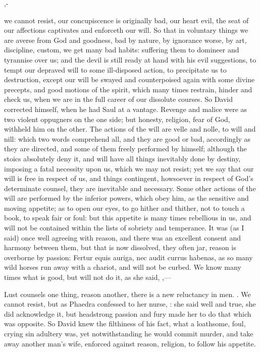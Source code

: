 {,-

we cannot resist, our concupiscence is originally bad, our heart evil,
the seat of our affections captivates and enforceth our will. So that
in voluntary things we are averse from God and goodness, bad by nature,
by ignorance worse, by art, discipline, custom, we get many bad
habits: suffering them to domineer and tyrannise over us; and the devil
is still ready at hand with his evil suggestions, to tempt our depraved
will to some ill-disposed action, to precipitate us to destruction,
except our will be swayed and counterpoised again with some divine
precepts, and good motions of the spirit, which many times restrain,
hinder and check us, when we are in the full career of our dissolute
courses. So David corrected himself, when he had Saul at a vantage.
Revenge and malice were as two violent oppugners on the one side; but
honesty, religion, fear of God, withheld him on the other.
The actions of the will are velle and nolle, to will and nill: which
two words comprehend all, and they are good or bad, accordingly as they
are directed, and some of them freely performed by himself; although
the stoics absolutely deny it, and will have all things inevitably done
by destiny, imposing a fatal necessity upon us, which we may not
resist; yet we say that our will is free in respect of us, and things
contingent, howsoever in respect of God's determinate counsel, they are
inevitable and necessary. Some other actions of the will are performed
by the inferior powers, which obey him, as the sensitive and moving
appetite; as to open our eyes, to go hither and thither, not to touch a
book, to speak fair or foul: but this appetite is many times rebellious
in us, and will not be contained within the lists of sobriety and
temperance. It was (as I said) once well agreeing with reason, and
there was an excellent consent and harmony between them, but that is
now dissolved, they often jar, reason is overborne by passion: Fertur
equis auriga, nec audit currus habenas, as so many wild horses run away
with a chariot, and will not be curbed. We know many times what is
good, but will not do it, as she said,
,---

Lust counsels one thing, reason another, there is a new reluctancy in
men. . We cannot
resist, but as Phaedra confessed to her nurse, : she said well and true, she
did acknowledge it, but headstrong passion and fury made her to do that
which was opposite. So David knew the filthiness of his fact, what a
loathsome, foul, crying sin adultery was, yet notwithstanding he would
commit murder, and take away another man's wife, enforced against
reason, religion, to follow his appetite.

}
